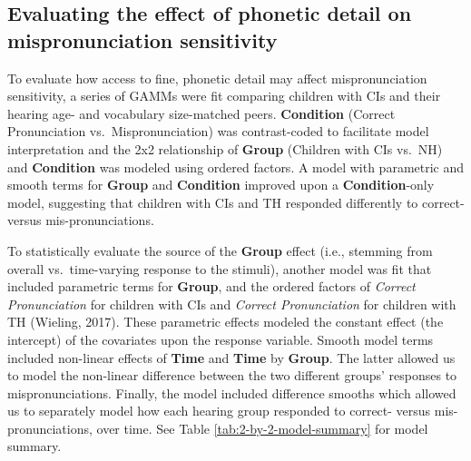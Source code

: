 \documentclass[
]{article}
\begin{document}
\hypertarget{evaluating-the-effect-of-phonetic-detail-on-mispronunciation-sensitivity}{%
\subsection{Evaluating the effect of phonetic detail on mispronunciation sensitivity}\label{evaluating-the-effect-of-phonetic-detail-on-mispronunciation-sensitivity}}

To evaluate how access to fine, phonetic detail may affect mispronunciation sensitivity, a series of GAMMs were fit comparing children with CIs and their hearing age- and vocabulary size-matched peers. \textbf{Condition} (Correct Pronunciation vs.~Mispronunciation) was contrast-coded to facilitate model interpretation and the 2x2 relationship of \textbf{Group} (Children with CIs vs.~NH) and \textbf{Condition} was modeled using ordered factors. A model with parametric and smooth terms for \textbf{Group} and \textbf{Condition} improved upon a \textbf{Condition}-only model, suggesting that children with CIs and TH responded differently to correct- versus mis-pronunciations.

To statistically evaluate the source of the \textbf{Group} effect (i.e., stemming from overall vs.~time-varying response to the stimuli), another model was fit that included parametric terms for \textbf{Group}, and the ordered factors of \emph{Correct Pronunciation} for children with CIs and \emph{Correct Pronunciation} for children with TH (Wieling, 2017). These parametric effects modeled the constant effect (the intercept) of the covariates upon the response variable. Smooth model terms included non-linear effects of \textbf{Time} and \textbf{Time} by \textbf{Group}. The latter allowed us to model the non-linear difference between the two different groups' responses to mispronunciations. Finally, the model included difference smooths which allowed us to separately model how each hearing group responded to correct- versus mis-pronunciations, over time. See Table \ref{tab:2-by-2-model-summary} for model summary.
\end{document}

